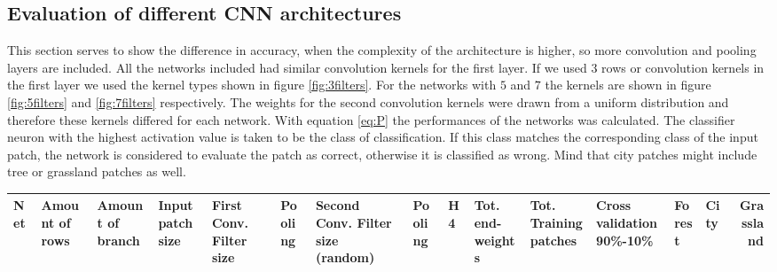 \documentclass[a4paper,onecolumn]{report}
\begin{document}
\begin{appendices}
	
\chapter{Evaluation of different CNN architectures}
\label{app:DiffentArchitectures}
This section serves to show the difference in accuracy,  when the complexity of the architecture is higher, so more convolution and pooling layers are included. All the networks included had similar convolution kernels for the first layer. If we used $3$ rows or convolution kernels in the first layer we used the kernel types shown in figure \ref{fig:3filters}. For the networks with $5$ and $7$ the kernels are shown in figure \ref{fig:5filters} and \ref{fig:7filters} respectively. The weights for the second convolution kernels were drawn from a uniform distribution and therefore these kernels differed for each network. With equation \ref{eq:P} the performances of the networks was calculated. The classifier neuron with the highest activation value is taken to be the class of classification. If this class matches the corresponding class of the input patch, the network is considered to evaluate the patch as correct, otherwise it is classified as wrong. Mind that city patches might include tree or grassland patches as well.

\begin{tiny}
	\begin{center}
		\begin{tabular}{| l |p{0.5cm} |p{0.5cm} |p{0.5cm} |p{0.75cm} |p{0.7cm} |p{0.7cm} |p{0.75cm} |p{0.75cm} |p{0.75cm} |p{0.5cm} |p{0.8cm} |p{0.8cm} |p{0.8cm} |r | }
			\hline
			Net	& Amount of rows	& Amount of branch	& Input patch size	& First Conv. Filter size	& Pooling	& Second Conv. Filter size (random)&	Pooling	&H4	& Tot. end-weights	&Tot. Training patches	& Cross validation 90\%-10\% & Forest &	City	& Grassland \\ \hline
			

\end{tabular}
\end{center}
\end{tiny}
\end{appendices}
\end{document}
